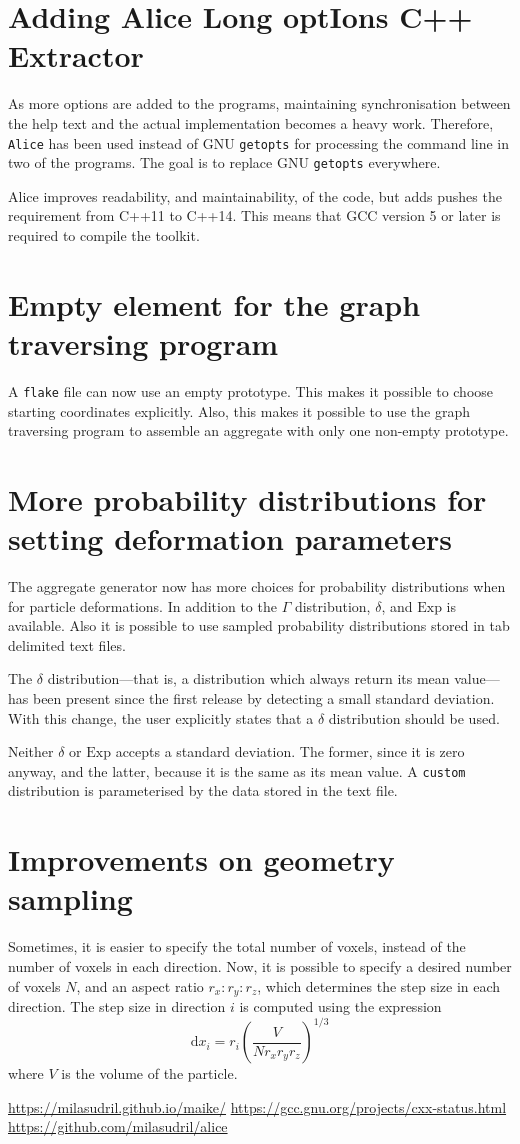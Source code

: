 \documentclass[a4paper,10pt]{scrartcl}
\newcommand{\prgname}[1]{\texttt{#1}}
\newcommand{\dd}{\mathrm{d}}
\begin{document}
\section{Adding Alice Long optIons C++ Extractor}
As more options are added to the programs, maintaining synchronisation between the help text and the actual implementation becomes a heavy work. Therefore, \prgname{Alice}\cite{alice} has been used instead of GNU \prgname{getopts} for processing the command line in two of the programs. The goal is to replace GNU \prgname{getopts} everywhere.

Alice improves readability, and maintainability, of the code, but adds pushes the requirement from C++11 to C++14. This means that GCC version 5 or later\cite{GCC} is required to compile the toolkit.

\section{Empty element for the graph traversing program}
A \texttt{flake} file can now use an empty prototype. This makes it possible to choose starting coordinates explicitly. Also, this makes it possible to use the graph traversing program to assemble an aggregate with only one non-empty prototype.

\section{More probability distributions for setting deformation parameters}
The aggregate generator now has more choices for probability distributions when for particle deformations. In addition to the $\Gamma$ distribution, $\delta$, and $\text{Exp}$ is available. Also it is possible to use sampled probability distributions stored in tab delimited text files.

The $\delta$ distribution---that is, a distribution which always return its mean value---has been present since the first release by detecting a small standard deviation. With this change, the user explicitly states that a $\delta$ distribution should be used.

Neither $\delta$ or $\text{Exp}$ accepts a standard deviation. The former, since it is zero anyway, and the latter, because it is the same as its mean value. A \texttt{custom} distribution is parameterised by the data stored in the text file.


\section{Improvements on geometry sampling}
Sometimes, it is easier to specify the total number of voxels, instead of the number of voxels in each direction. Now, it is possible to specify a desired number of voxels $N$, and an aspect ratio $r_x:r_y:r_z$, which determines the step size in each direction. The step size in direction $i$ is computed using the expression
\[
 \dd x_i = r_i \left(\frac{V}{N r_x r_y r_z}\right)^{1/3}
\]
where $V$ is the volume of the particle.




\begin{thebibliography}{9}
 \url{https://milasudril.github.io/maike/}
 \url{https://gcc.gnu.org/projects/cxx-status.html}
 \url{https://github.com/milasudril/alice}
\end{thebibliography}
\end{document}
